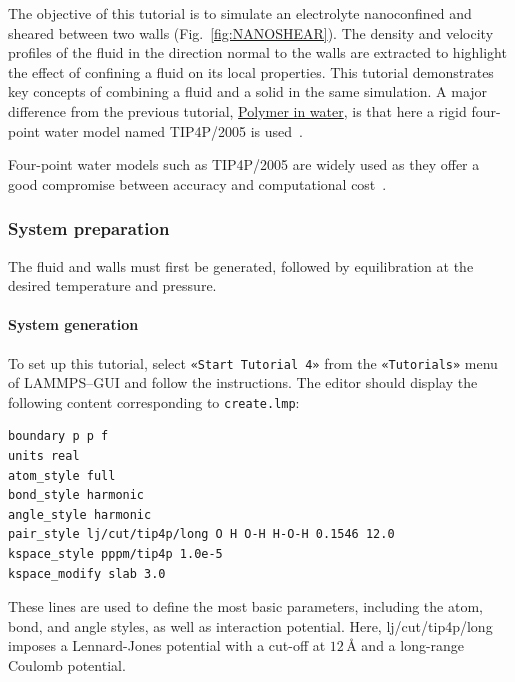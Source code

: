\documentclass[9pt,tutorial]{livecoms}
\newcommand{\lmpcmd}[1]{\hspace{0pt}\colorbox{listing}{\textcolor{command}{\small{#1}}}\hspace{0pt}} %
\newcommand{\flecmd}[1]{\textcolor{command}{\texttt{#1}}} %
\newcommand{\guicmd}[1]{\textcolor{command}{\texttt{«#1»}}} %
\begin{document}
\noindent The objective of this tutorial is to simulate an electrolyte
nanoconfined and sheared between two walls (Fig.~\ref{fig:NANOSHEAR}).  The density
and velocity profiles of the fluid in the direction normal to the walls are
extracted to highlight the effect of confining a fluid on its local properties.
This tutorial demonstrates key concepts of combining a fluid and a solid in
the same simulation.  A major difference from the previous tutorial,
\hyperref[all-atom-label]{Polymer in water}, is that here a rigid four-point
water model named TIP4P/2005 is used~\cite{abascal2005general}.

\begin{note}
Four-point water models such as TIP4P/2005 are widely used as they offer a
good compromise between accuracy and computational cost~\cite{kadaoluwa2021systematic}.
\end{note}

\subsubsection{System preparation}

The fluid and walls must first be generated, followed by equilibration at the
desired temperature and pressure.

\paragraph{System generation}

To set up this tutorial, select \guicmd{Start Tutorial 4} from the
\guicmd{Tutorials} menu of LAMMPS--GUI and follow the instructions.
The editor should display the following content corresponding to \flecmd{create.lmp}:
\begin{lstlisting}
boundary p p f
units real
atom_style full
bond_style harmonic
angle_style harmonic
pair_style lj/cut/tip4p/long O H O-H H-O-H 0.1546 12.0
kspace_style pppm/tip4p 1.0e-5
kspace_modify slab 3.0
\end{lstlisting}
These lines are used to define the most basic parameters, including the
\lmpcmd{atom}, \lmpcmd{bond}, and \lmpcmd{angle} styles, as well as interaction
potential.  Here, \lmpcmd{lj/cut/tip4p/long} imposes a Lennard-Jones potential with
a cut-off at $12\,\text{$\text{\AA{}}$}$ and a long-range Coulomb potential.
\end{document}
